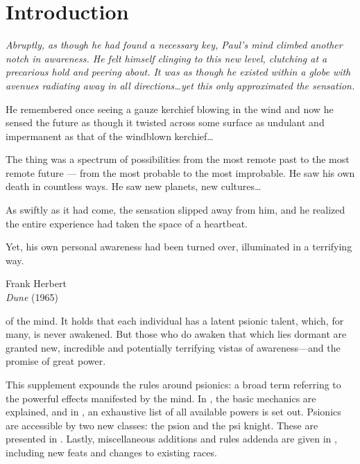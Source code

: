 



\frontmatter
\maketitle
\tableofcontents

\mainmatter%

\chapter{Introduction}
\epigraph{\itshape
  Abruptly, as though he had found a necessary key,
  Paul's mind climbed another notch in awareness.
  He felt himself clinging to this new level,
  clutching at a precarious hold and peering about.
  It was as though he existed within a globe with
  avenues radiating away in all directions\ldots yet this only
  approximated the sensation.
  
  \vspace{2mm}He remembered once seeing a gauze kerchief blowing in
  the wind and now he sensed the future as though it twisted
  across some surface as undulant and impermanent as that of
  the windblown kerchief\ldots
  
  \vspace{2mm}The thing was a spectrum of possibilities from the most
  remote past to the most remote future --- from the most
  probable to the most improbable. He saw his own death in
  countless ways. He saw new planets, new cultures\ldots
  
  \vspace{2mm}As swiftly as it had come, the sensation slipped away from
  him, and he realized the entire experience had taken the space
  of a heartbeat.
  
  \vspace{2mm}Yet, his own personal awareness had been turned over,
  illuminated in a terrifying way.\normalfont}
  {Frank Herbert\\\textit{Dune} (1965)}

of the mind.
It holds that each individual has a latent psionic talent,
which, for many,
is never awakened.
But those who do awaken that which lies dormant
are granted new, incredible and potentially terrifying
vistas of awareness---and the promise of great power.

This supplement expounds the rules around psionics:
a broad term referring to the powerful effects
manifested by the mind.
In ,
the basic mechanics are explained,
and in ,
an exhaustive list of all available powers is set out.
Psionics are accessible by two new classes: the psion
and the psi knight.
These are presented in .
Lastly, miscellaneous additions and rules addenda
are given in ,
including new feats and changes to existing races.\newpage


